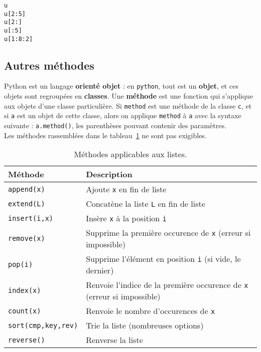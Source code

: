 \begin{lstlisting}
u
u[2:5]
u[2:]
u[:5]
u[1:8:2]
\end{lstlisting}

\subsection{Autres méthodes}
Python est un langage \textbf{orienté objet} : en \texttt{python}, tout est un \textbf{objet}, et ces objets 
sont regroupées en \textbf{classes}. Une \textbf{méthode} est une fonction qui s'applique aux objets 
d'une classe particulière. Si \texttt{method} est une méthode de la classe \texttt{c}, et si 
\texttt{a} est un objet de cette classe, alors on applique \texttt{method} à \texttt{a} avec la 
syntaxe suivante : \texttt{a.method()}, les parenthèses pouvant contenir des paramètres.\\

%

Les méthodes rassemblées dans le tableau~\ref{tab.list.methodes} ne sont pas exigibles.
\begin{table}[!h]
\centering
    \begin{tabular}{lp{9cm}}
      \hline 
      \textbf{Méthode} & \textbf{Description} \\
      \hline
      \texttt{append(x)} & Ajoute \texttt{x} en fin de liste \\
      \texttt{extend(L)} & Concatène la liste \texttt{L} en fin de liste \\
      \texttt{insert(i,x)} & Insère  \texttt{x} à la position \texttt{i} \\
      \texttt{remove(x)} & Supprime la première occurence de \texttt{x} (erreur si impossible)\\
      \texttt{pop(i)} & Supprime l'élément en position \texttt{i} (si vide, le dernier) \\
      \texttt{index(x)} & Renvoie l'indice de la première occurence de \texttt{x} (erreur si impossible)\\
      \texttt{count(x)} & Renvoie le nombre d'occurences de \texttt{x} \\
      \texttt{sort(cmp,key,rev)} & Trie la liste (nombreuses options) \\
      \texttt{reverse()} & Renverse la liste \\
      \hline
    \end{tabular}
    \caption{Méthodes applicables aux listes.}
  \label{tab.list.methodes}
  \end{table}
  
